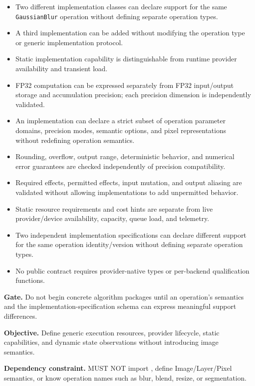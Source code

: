 \exitcriteria
\begin{itemize}
  \item Two different implementation classes can declare support for the same \texttt{GaussianBlur} operation without defining separate operation types.
  \item A third implementation can be added without modifying the operation type or generic implementation protocol.
  \item Static implementation capability is distinguishable from runtime provider availability and transient load.
  \item FP32 computation can be expressed separately from FP32 input/output storage and accumulation precision; each precision dimension is independently validated.
  \item An implementation can declare a strict subset of operation parameter domains, precision modes, semantic options, and pixel representations without redefining operation semantics.
  \item Rounding, overflow, output range, deterministic behavior, and numerical error guarantees are checked independently of precision compatibility.
  \item Required effects, permitted effects, input mutation, and output aliasing are validated without allowing implementations to add unpermitted behavior.
  \item Static resource requirements and cost hints are separate from live provider/device availability, capacity, queue load, and telemetry.
  \item Two independent implementation specifications can declare different support for the same operation identity/version without defining separate operation types.
  \item No public contract requires provider-native types or per-backend qualification functions.
\end{itemize}

\textbf{Gate.} Do not begin concrete algorithm packages until an operation's semantics and the implementation-specification schema can express meaningful support differences.


\textbf{Objective.} Define generic execution resources, provider lifecycle, static capabilities, and dynamic state observations without introducing image semantics.

\textbf{Dependency constraint.} \GEP{} MUST NOT import \IPP{}, define Image/Layer/Pixel semantics, or know operation names such as blur, blend, resize, or segmentation.

